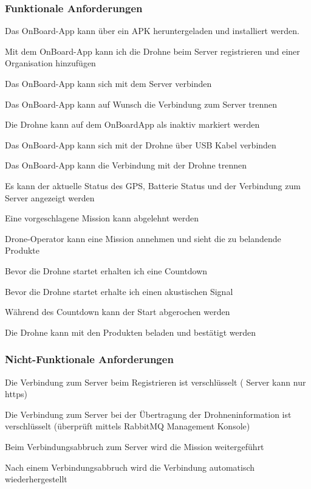 \subsubsection{Funktionale Anforderungen}	
\begin{todolist}
	\item[\done] Das OnBoard-App kann über ein APK heruntergeladen und installiert werden.
	\item[\done] Mit dem OnBoard-App kann ich die Drohne beim Server registrieren und einer Organisation hinzufügen
	\item[\done] Das OnBoard-App kann sich mit dem Server verbinden
	\item[\done] Das OnBoard-App kann auf Wunsch die Verbindung zum Server trennen
	\item[\done] Die Drohne kann auf dem OnBoardApp als inaktiv markiert werden
	\item[\done] Das OnBoard-App kann sich mit der Drohne über USB Kabel verbinden
	\item[\done] Das OnBoard-App kann die Verbindung mit der Drohne trennen
	\item[\done] Es kann der aktuelle Status des GPS, Batterie Status und der Verbindung zum Server angezeigt werden
	\item[\done] Eine vorgeschlagene Mission kann abgelehnt werden
	\item[\done] Drone-Operator kann eine Mission annehmen und sieht die zu belandende Produkte
	\item[\done] Bevor die Drohne startet erhalten ich eine Countdown
	\item[\done] Bevor die Drohne startet erhalte ich einen akustischen Signal 
	\item[\done] Während des Countdown kann der Start abgerochen werden
	\item[\done] Die Drohne kann mit den Produkten beladen und bestätigt werden
\end{todolist}

\subsubsection{Nicht-Funktionale Anforderungen}	
\begin{todolist}
	\item[\done] Die Verbindung zum Server beim Registrieren ist verschlüsselt ( Server kann nur https)
	\item[\done] Die Verbindung zum Server bei der Übertragung der Drohneninformation ist verschlüsselt (überprüft mittels RabbitMQ Management Konsole)
	\item[\done] Beim Verbindungsabbruch zum Server wird die Mission weitergeführt
	\item[\done] Nach einem Verbindungsabbruch wird die Verbindung automatisch wiederhergestellt
\end{todolist}

